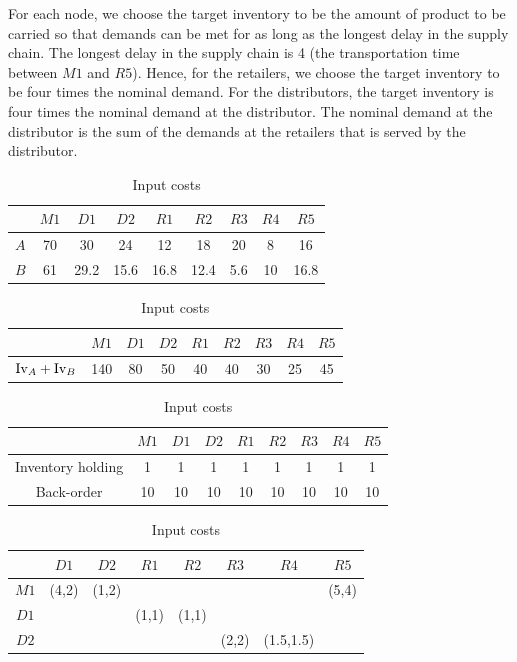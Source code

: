 For each node, we choose the target inventory to be the amount of
product to be carried so that demands can be met for as long as the
longest delay in the supply chain. The longest delay in the supply
chain is 4 (the transportation time between $M1$ and $R5$). Hence, for
the retailers, we choose the target inventory to be four times the
nominal demand. For the distributors, the target inventory is four
times the nominal demand at the distributor. The nominal demand at the
distributor is the sum of the demands at the retailers that is served
by the distributor. 

\begin{table}
\caption{Target inventories}
\label{tab:esc:targinv}
\begin{center}
\begin{tabular}{ccccccccc}\toprule
& $M1$ & $D1$ & $D2$  & $R1$ & $R2$ & $R3$ & $R4$ & $R5$ \\
\midrule
$A$&70&30  &24   &12  &18  &20 &8 &16\\
$B$&61&29.2&15.6 &16.8&12.4&5.6&10&16.8 \\
\bottomrule
\end{tabular}
\end{center}
\caption{Capacity constraints}
\label{tab:esc:constraints}
\begin{center}
\begin{tabular}{ccccccccc}\toprule
& $M1$ & $D1$ & $D2$  & $R1$ & $R2$ & $R3$ & $R4$ & $R5$ \\
\midrule
$\textrm{Iv}_A+\textrm{Iv}_B$&140&80  &50   &40  &40  &30 &25 &45\\
\bottomrule
\end{tabular}
\end{center}
\caption{State economic costs}
\label{tab:esc:state_economic}
\begin{center}
\begin{tabular}{ccccccccc}\toprule
& $M1$ & $D1$ & $D2$  & $R1$ & $R2$ & $R3$ & $R4$ & $R5$ \\
\midrule
Inventory holding&1&1  &1   &1  &1  &1 &1 &1\\
Back-order&10&10&10 &10&10&10&10&10 \\
\bottomrule
\end{tabular}
\end{center}
\caption{Input costs}
\label{tab:esc:input_economic}
\begin{center}
\begin{tabular}{cccccccc}\toprule
& $D1$ & $D2$  & $R1$ & $R2$ & $R3$ & $R4$ & $R5$ \\
\midrule
$M1$ &(4,2)&(1,2)& & & & &(5,4)\\
$D1$ & & &(1,1)&(1,1)& & & \\
$D2$ & & & & &(2,2)&(1.5,1.5)& \\
\bottomrule
\end{tabular}
\end{center}
\end{table}

